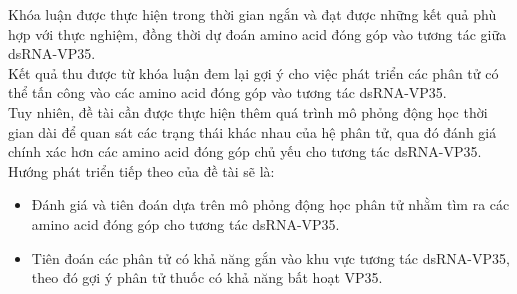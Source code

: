 \documentclass[12pt,a4paper,reqno, oneside]{book}
\begin{document}
	Khóa luận được thực hiện trong thời gian ngắn và đạt được những kết quả phù hợp với thực nghiệm, đồng thời dự đoán amino acid đóng góp vào tương tác giữa dsRNA-VP35.\\ 
	Kết quả thu được từ khóa luận đem lại gợi ý cho việc phát triển các phân tử có thể tấn công vào các amino acid đóng góp vào tương tác dsRNA-VP35.\\
	Tuy nhiên, đề tài cần được thực hiện thêm quá trình mô phỏng động học thời gian dài để quan sát các trạng thái khác nhau của hệ phân tử, qua đó đánh giá chính xác hơn các amino acid đóng góp chủ yếu cho tương tác dsRNA-VP35.\\
	Hướng phát triển tiếp theo của đề tài sẽ là:
	\begin{itemize}
	\item Đánh giá và tiên đoán dựa trên mô phỏng động học phân tử nhằm tìm ra các amino acid đóng góp cho tương tác dsRNA-VP35.
	\item Tiên đoán các phân tử có khả năng gắn vào khu vực tương tác dsRNA-VP35, theo đó gợi ý phân tử thuốc có khả năng bất hoạt VP35.
	\end{itemize}
	


\printbibliography
{}
\clearpage





\appendix
{}
\clearpage
%
\newpage

\end{document}
